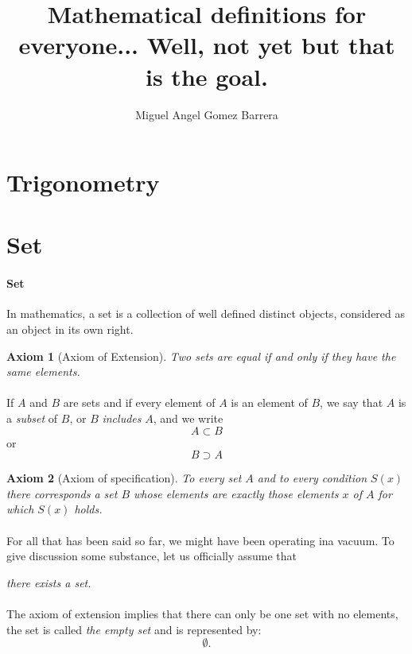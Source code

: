 \documentclass{article}
\newtheorem{axiom}{Axiom}[section]
\begin{document}
\title{Mathematical definitions for everyone... Well, not yet but that is the goal.}
\author{Miguel Angel Gomez Barrera}

\maketitle

\section{Trigonometry}

\section{Set}

\paragraph{Set} In mathematics, a set is a collection of well defined distinct objects, considered as an object in its own right.

\begin{axiom}[Axiom of Extension] Two sets are equal if and only if they have the same elements.
\end{axiom}

\paragraph{}If $A$ and $B$ are sets and if every element of $A$ is an element of $B$, we say that $A$ is a \textit{subset} of $B$, or $B$ \textit{includes} $A$, and we write
$$A \subset B$$
or
$$B \supset A$$
\begin{axiom}[Axiom of specification]
	To every set $A$ and to every condition $S(x)$ there corresponds a set $B$ whose elements are exactly those elements $x$ of $A$ for which $S(x)$ holds.
\end{axiom}

\paragraph{}For all that has been said so far, we might have been operating ina vacuum. To give discussion some substance, let us officially assume that
\begin{center}
	\textit{there exists a set.}
\end{center}
\paragraph{}The axiom of extension implies that there can only be one set with no elements, the set is called \textit{the empty set} and is represented by:
$$\emptyset.$$
\end{document}
